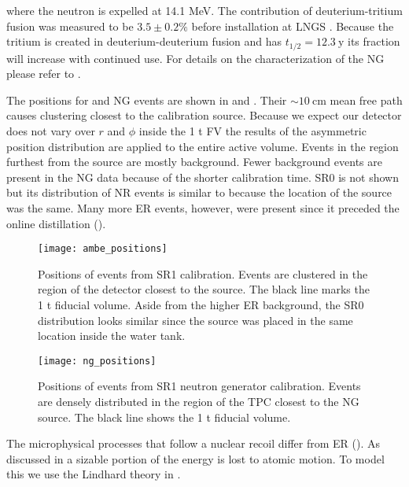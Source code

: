 \noindent where the neutron is expelled at 14.1 MeV.  The contribution of deuterium-tritium fusion was measured to be $3.5 \pm 0.2\%$
before installation at LNGS .  Because the tritium is created in deuterium-deuterium fusion and has
$t_{1/2} = 12.3\ \mathrm{y}$ its fraction will increase with continued use.  For details on the characterization of the NG
please refer to .

The positions for \ambe and NG events are shown in  and
.  Their ${\sim}10\ \mathrm{cm}$ mean free path causes clustering
closest to the calibration source.  Because we expect our
detector does not vary over $r$ and $\phi$ inside the 1 t FV the results of the asymmetric position distribution are applied to the entire
active volume.  Events in the region furthest from the source are mostly background.  Fewer background events are present in the NG data
because of the shorter calibration time.  SR0 \ambe is not shown but its distribution of NR events is similar to
 because the location of the source was the same.  Many more ER events,
however, were present since it preceded the online distillation ().

\begin{figure}
\centering
\texttt{[image: ambe\_positions]}
\caption{Positions of events from SR1 \ambe calibration.  Events are clustered in the region of the detector closest to the \ambe
source.  The black line marks the 1 t fiducial volume.  Aside from the higher ER background, the SR0 distribution looks similar since the
source was placed in the same location inside the water tank.}
\label{fig:er_nr_calibrations_parameter_determ_nr_ambe_positions}
\end{figure}

\begin{figure}
\centering
\texttt{[image: ng\_positions]}
\caption{Positions of events from SR1 neutron generator calibration.  Events are densely distributed in the region of the TPC closest to
the NG source.  The black line shows the 1 t fiducial volume.}
\label{fig:er_nr_calibrations_parameter_determ_nr_ng_positions}
\end{figure}

The microphysical processes that follow a nuclear recoil differ from ER ().  As
discussed in  a sizable portion of the energy is lost to atomic motion.  To model this we use the Lindhard theory
in .

